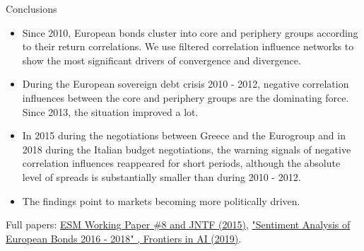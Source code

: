 \documentclass{beamer}
\begin{document}
\begin{frame}{Conclusions}
\begin{itemize}
\item Since 2010, European bonds cluster into core and periphery groups according to their return correlations. We use filtered correlation influence networks to show the most significant drivers of convergence and divergence.
\item During the European sovereign debt crisis 2010 - 2012, negative correlation influences between the core and periphery groups are the dominating force. Since 2013, the situation improved a lot.
\item In 2015 during the negotiations between Greece and the Eurogroup and in 2018 during the Italian budget negotiations, the warning signals of negative correlation influences reappeared for short periods, although the absolute level of spreads is substantially smaller than during 2010 - 2012.
\item The findings point to markets becoming more politically driven.
\end{itemize}
Full papers: \href{https://www.esm.europa.eu/publications/european-government-bond-dynamics-and-stability-policies-taming-contagion-risks}{ESM Working Paper \#8 and JNTF (2015)}, \href{https://www.frontiersin.org/articles/10.3389/frai.2019.00020/full}{"Sentiment Analysis of European Bonds 2016 - 2018" , Frontiers in AI (2019)}.
\end{frame}
\end{document}
